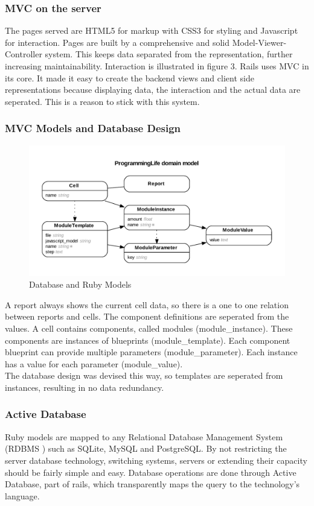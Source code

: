\documentclass{report}
\begin{document}
				\subsubsection{MVC on the server}
					The pages served are HTML5 for markup with CSS3 for styling and Javascript for interaction. Pages are built by a comprehensive and solid Model-Viewer-Controller system. This keeps data separated from the representation, further increasing maintainability. Interaction is illustrated in figure 3. Rails uses MVC in its core. It made it easy to create the backend views and client side representations because displaying data, the interaction and the actual data are seperated. This is a reason to stick with this system.
				\subsubsection{MVC Models and Database Design}
					\begin{figure}[htb]
						\begin{center}
							\includegraphics[width=\linewidth]{erd.pdf}
							\caption{Database and Ruby Models}
							\label{fig: erd}
						\end{center}
					\end{figure}	
					A report always shows the current cell data, so there is a one to one relation between reports and cells. The component definitions are seperated from the values. A cell contains components, called modules (module\_instance). These components are instances of blueprints (module\_template). Each component blueprint can provide multiple parameters (module\_parameter). Each instance has a value for each parameter (module\_value).\\
					The database design was devised this way, so templates are seperated from instances, resulting in no data redundancy.
				\subsubsection{Active Database}
					Ruby models are mapped to any Relational Database Management System (RDBMS \cite{rdbms} ) such as SQLite, MySQL and PostgreSQL. By not restricting the server database technology, switching systems, servers or extending their capacity should be fairly simple and easy. Database operations are done through Active Database, part of rails, which transparently maps the query to the technology's language.
\end{document}
